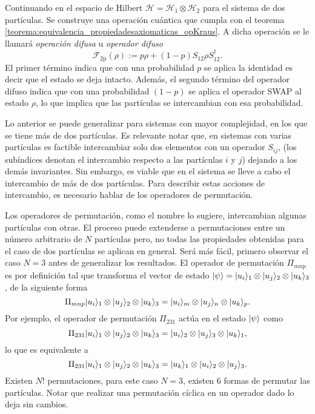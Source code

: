 Continuando en el espacio de Hilbert  $\mathcal{H}=\mathcal{H}_1\otimes\mathcal{H}_2$ para el sistema de dos partículas. Se construye una operación cuántica que cumpla con el teorema {\ref{teorema:equivalencia_propiedadesaxiomaticas_opKraus}}. A dicha operación se le  llamará \textit{operación difusa} u \textit{operador difuso}\begin{equation}\label{op_F2p}
    \mathcal{F}_{2\text{p}}(\rho):=p\rho + (1-p)S_{12}\rho S_{12}^{\dagger}.
\end{equation}
El primer término indica que con una probabilidad $p$  se aplica la identidad es decir que el estado se deja intacto.  Además, el segundo término del operador difuso indica que con una probabilidad $(1-p)$ se aplica el operador SWAP al estado $\rho$, lo que implica que las partículas se intercambian con esa probabilidad.


Lo anterior se puede generalizar para sistemas con mayor complejidad, en los que se tiene más de dos partículas.  Es relevante notar que, en sistemas con varias partículas es factible intercambiar solo dos elementos con un operador $S_{ij}$, (los subíndices denotan el intercambio respecto a las partículas $i$ y $j$) dejando a los demás invariantes.  Sin embargo, es viable que en el sistema se lleve a cabo el intercambio de más de dos partículas. Para describir estas acciones de intercambio, es necesario hablar de los operadores de permutación.

Los operadores de permutación, como el nombre lo sugiere, intercambian algunas partículas con otras. El proceso puede extenderse a permutaciones entre un número arbitrario de $N$ partículas pero, no todas las propiedades obtenidas para el caso de dos partículas se aplican en general. Será más fácil, primero  observar el caso $N = 3$ antes de generalizar los resultados. El operador de permutación $\Pi_{mnp}$ es por definición tal que transforma el vector de estado $|\psi\rangle= |u_i\rangle_1\otimes |u_j\rangle_2 \otimes |u_k\rangle_3$, de la siguiente forma {\cite{cohen1977quantum}}\[\Pi_{mnp} |u_i\rangle_1\otimes |u_j\rangle_2 \otimes |u_k\rangle_3= |u_i\rangle_m\otimes |u_j\rangle_n \otimes |u_k\rangle_p.\] Por ejemplo, el operador de permutación $\Pi_{231}$ actúa en el estado $|\psi\rangle$ como  
\[\Pi_{231} |u_i\rangle_1\otimes |u_j\rangle_2 \otimes |u_k\rangle_3= |u_i\rangle_2\otimes |u_j\rangle_3 \otimes |u_k\rangle_1,\] lo que es equivalente a 
\[\Pi_{231} |u_i\rangle_1\otimes |u_j\rangle_2 \otimes |u_k\rangle_3= |u_k\rangle_1\otimes|u_i\rangle_2\otimes  |u_j\rangle_3.\]  Existen $N$! permutaciones, para este caso $N = 3$, existen 6 formas de permutar las partículas. Notar que realizar una permutación cíclica en un operador dado lo deja sin cambios. 



